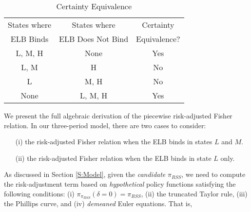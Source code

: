 \documentclass[11pt]{article}
\begin{document}
\begin{singlespace}
		\begin{table}
			\centering
			\begin{tabular}{ccc}
				\hline
				\hline
				States where & States where  & Certainty  \\
				ELB Binds & ELB Does Not Bind & Equivalence?\\
				\hline
				L, M, H & None & Yes\\
				L, M & H & No \\
				L & M, H & No \\
				None & L, M, H & Yes\\
				\hline
				\hline
			\end{tabular}
			\caption{Certainty Equivalence}
			\label{t:Uncertainty}
		\end{table}
		
		
		We present the full algebraic derivation of the piecewise risk-adjusted Fisher relation. In our three-period model, there are two cases to consider: 
		\begin{enumerate}
			\item[(i)] the risk-adjusted Fisher relation when the ELB binds in states $L$ and $M$.
			\item[(ii)] the risk-adjusted Fisher relation when the ELB binds in state $L$ only.
		\end{enumerate}
		As discussed in Section \ref{S:Model}, given the \textit{candidate} $\pi_{RSS}$, we need to compute the risk-adjustment term based on \textit{hypothetical} policy functions satisfying the following conditions: (i) $\pi_{\pi_{RSS}}(\delta=0)=\pi_{RSS}$, (ii) the truncated Taylor rule, (iii) the Phillips curve,  and (iv) \textit{demeaned} Euler equations. That is, 
		

\end{singlespace}
\end{document}
